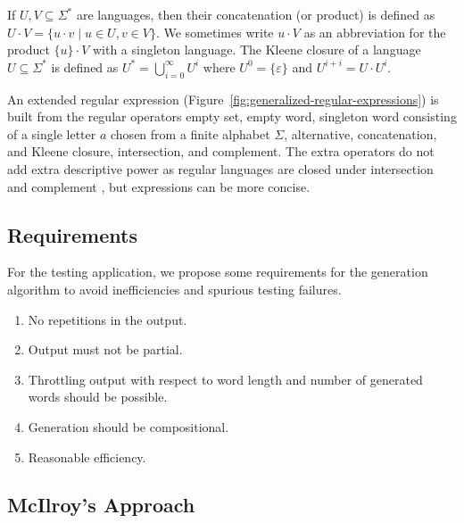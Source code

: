 If $U, V \subseteq \Sigma^*$ are
languages, then their concatenation (or product) is defined as $U\cdot
V = \{ u\cdot v \mid u\in U, v\in V\}$. We sometimes write $u\cdot V$
as an abbreviation for the product $\{u\}\cdot V$ with a singleton
language. The Kleene closure of a
language $U\subseteq \Sigma^*$ is defined as $U^* =
\bigcup_{i=0}^\infty U^i$ where $U^0 = \{\varepsilon\}$ and $U^{i+i} =
U \cdot U^i$. 

An extended regular expression
(Figure~\ref{fig:generalized-regular-expressions}) is built from the
regular operators empty set, empty word, singleton word consisting of
a single letter $a$ chosen from a finite alphabet $\Sigma$,
alternative, concatenation, and Kleene closure, intersection, and complement. The extra
operators 
do not add extra descriptive power as regular languages are closed
under intersection and complement \cite{DBLP:books/daglib/0011126},
but expressions can be more concise.

\subsection{Requirements}
\label{sec:requirements}

For the testing application, we propose some requirements for the generation algorithm to
avoid inefficiencies and spurious testing failures.
\begin{enumerate}
\item No repetitions in the output. %
\item Output must not be partial.
\item Throttling output with respect to word
  length and number of generated words should be possible.
\item Generation should be compositional.
\item Reasonable efficiency.
\end{enumerate}


\subsection{McIlroy's Approach}
\label{sec:naive-approach}

